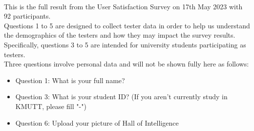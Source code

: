 \documentclass[12pt,oneside,openright,a4paper]{cpe-english-project}
\begin{document}
\\
\label{appendix:satisfaction-test-responses} 
This is the full result from the User Satisfaction Survey on  17th May 2023 with 92 participants. \\
Questions 1 to 5 are designed to collect tester data in order to help us understand the demographics of the testers and how they may impact the survey results. Specifically, questions 3 to 5 are intended for university students participating as testers. \\
Three questions involve personal data and will not be shown fully here as follows:
\begin{itemize}
	\item Question 1: What is your full name?
	\item Question 3: What is your student ID? (If you aren't currently study in KMUTT, please fill "-")
	\item Question 6: Upload your picture of Hall of Intelligence
\end{itemize}
\end{document}
